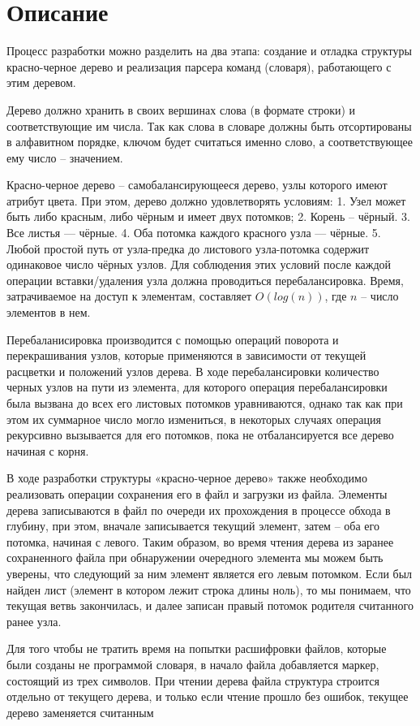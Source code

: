 \section{Описание}
Процесс разработки можно разделить на два этапа: создание и отладка структуры красно-черное дерево и реализация парсера команд (словаря), работающего с этим деревом.

Дерево должно хранить в своих вершинах слова (в формате строки) и соответствующие им числа. Так как слова в словаре должны быть отсортированы в алфавитном
порядке, ключом будет считаться именно слово, а соответствующее ему число – значением.

Красно-черное дерево – самобалансирующееся дерево, узлы которого имеют атрибут
цвета. При этом, дерево должно удовлетворять условиям: 1. Узел может быть либо
красным, либо чёрным и имеет двух потомков; 2. Корень – чёрный. 3. Все листья
— чёрные. 4. Оба потомка каждого красного узла — чёрные. 5. Любой простой путь
от узла-предка до листового узла-потомка содержит одинаковое число чёрных узлов. Для соблюдения этих условий после каждой операции вставки/удаления узла
должна проводиться перебалансировка. Время, затрачиваемое на доступ к элементам, составляет $O(log(n))$, где $n$ – число элементов в нем.

Перебаланисировка производится с помощью операций поворота и перекрашивания
узлов, которые применяются в зависимости от текущей расцветки и положений узлов дерева. В ходе перебалансировки количество черных узлов на пути из элемента,
для которого операция перебалансировки была вызвана до всех его листовых потомков уравниваются, однако так как при этом их суммарное число могло измениться,
в некоторых случаях операция рекурсивно вызывается для его потомков, пока не
отбалансируется все дерево начиная с корня.

В ходе разработки структуры «красно-черное дерево» также необходимо реализовать
операции сохранения его в файл и загрузки из файла. Элементы дерева записываются в файл по очереди их прохождения в процессе обхода в глубину, при этом,
вначале записывается текущий элемент, затем – оба его потомка, начиная с левого.
Таким образом, во время чтения дерева из заранее сохраненного файла при обнаружении очередного элемента мы можем быть уверены, что следующий за ним элемент
является его левым потомком. Если был найден лист (элемент в котором лежит строка длины ноль), то мы понимаем, что текущая ветвь закончилась, и далее записан
правый потомок родителя считанного ранее узла.

Для того чтобы не тратить время на попытки расшифровки файлов, которые были
созданы не программой словаря, в начало файла добавляется маркер, состоящий из
трех символов. При чтении дерева файла структура строится отдельно от текущего
дерева, и только если чтение прошло без ошибок, текущее дерево заменяется считанным

